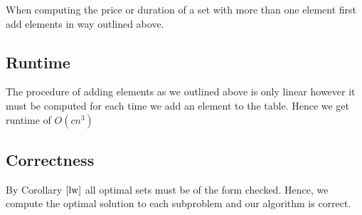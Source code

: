 \documentclass{article}
\begin{document}
When computing the price or duration of a set with more than one element first add elements in way outlined above. 
\subsection{Runtime}
The procedure of adding elements as we outlined above is only linear however it must be computed for each time we add an element to the table. Hence we get runtime of $O(cn^3)$

\subsection{Correctness}
By Corollary $\ref{lw}$ all optimal sets must be of the form checked. Hence, we compute the optimal solution to each subproblem and our algorithm is correct.
\end{document}
